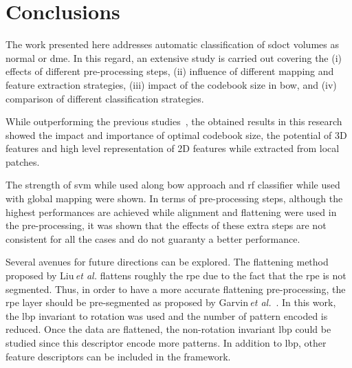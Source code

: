 \section{Conclusions}\label{sec:con}
The work presented here addresses automatic classification of \ac{sdoct} volumes as normal or \ac{dme}.
In this regard, an extensive study is carried out covering the
(i) effects of different pre-processing steps, 
(ii) influence of different mapping and feature extraction strategies,
(iii) impact of the codebook size in \ac{bow}, and
(iv) comparison of different classification strategies.

While outperforming the previous studies~\cite{Lemaintre2015miccaiOCT,Venhuizen2015}, the obtained results in this research showed the impact and importance of optimal codebook size, the potential of 3D features and high level representation of 2D features while extracted from local patches.

The strength of \ac{svm} while used along \ac{bow} approach and \ac{rf} classifier while used with global mapping were shown.
In terms of pre-processing steps, although the highest performances are achieved while alignment and flattening were used in the pre-processing, it was shown that the effects of these extra steps are not consistent for all the cases and do not guaranty a better performance.

Several avenues for future directions can be explored. 
The flattening method proposed by Liu\,\emph{et al.} flattens roughly the \ac{rpe} due to the fact that the \ac{rpe} is not segmented. 
Thus, in order to have a more accurate flattening pre-processing, the \ac{rpe} layer should be pre-segmented as proposed by Garvin\,\emph{et al.}~\cite{Garvin2009}. 
In this work, the \ac{lbp} invariant to rotation was used and the number of pattern encoded is reduced. 
Once the data are flattened, the non-rotation invariant \ac{lbp} could be studied since this descriptor encode more patterns. 
In addition to \ac{lbp}, other feature descriptors can be included in the framework.

